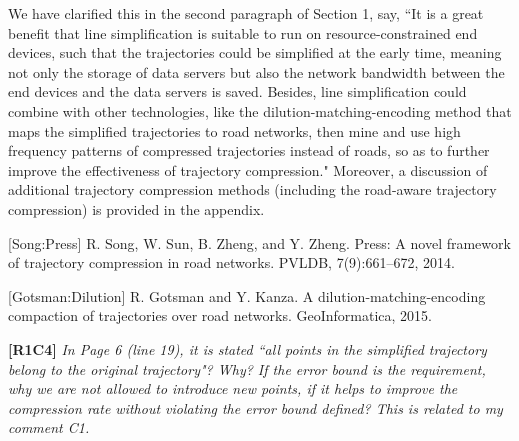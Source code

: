 \documentclass{letter}
\begin{document}
We have clarified this in the second paragraph of Section 1, say, {``It is a great benefit that line simplification is suitable to run on resource-constrained end devices, such that the trajectories could be simplified at the early time, meaning not only the storage of data servers but also the network bandwidth between the end devices and the data servers is saved. Besides, line simplification could combine with other technologies, like the dilution-matching-encoding method that maps the simplified trajectories to road networks, then mine and use high frequency patterns of compressed trajectories instead of roads, so as to further improve the effectiveness of trajectory compression."} Moreover, a discussion of additional trajectory compression methods (including the road-aware trajectory compression) is provided in the appendix.



[Song:Press] R. Song, W. Sun, B. Zheng, and Y. Zheng. Press: A novel framework of trajectory compression in road networks. PVLDB, 7(9):661--672, 2014.

[Gotsman:Dilution] R. Gotsman and Y. Kanza. A dilution-matching-encoding compaction of trajectories over road networks.
GeoInformatica, 2015.



\textbf{[R1C4]} \emph{ In Page 6 (line 19), it is stated ``all points in the simplified trajectory belong to the original trajectory"? Why? If the error bound is the requirement, why we are not allowed to introduce new points, if it helps to improve the compression rate without violating the error bound defined? This is related to my comment C1. }
\end{document}
